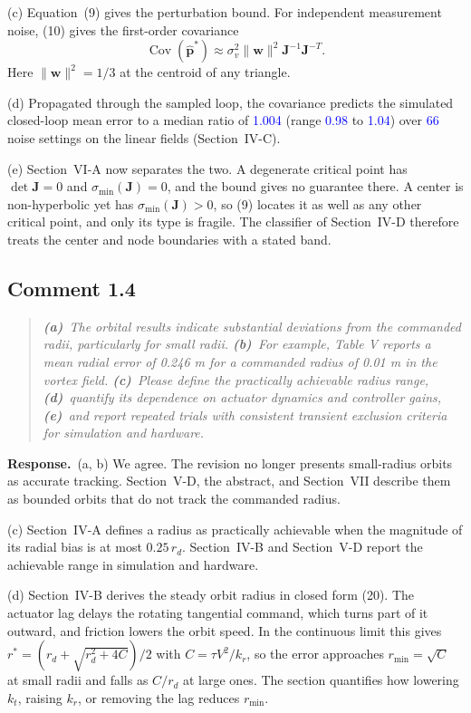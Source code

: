 \documentclass[10pt]{article}
\newcommand{\rev}[1]{\textcolor{blue}{#1}}           %
\newcommand{\resp}{\par\textbf{Response.}~}
\begin{document}
(c) Equation~(9) gives the perturbation bound. For independent measurement noise, (10) gives the first-order covariance
\[
\operatorname{Cov}(\hat{\mathbf{p}}^*) \approx \sigma_v^2\|\mathbf{w}\|^2\mathbf{J}^{-1}\mathbf{J}^{-T}.
\] Here $\|\mathbf{w}\|^2 = 1/3$ at the centroid of any triangle.

(d) Propagated through the sampled loop, the covariance predicts the simulated closed-loop mean error to a median ratio of \rev{1.004} (range \rev{0.98} to \rev{1.04}) over \rev{66} noise settings on the linear fields (Section~IV-C).

(e) Section~VI-A now separates the two. A degenerate critical point has $\det\mathbf{J} = 0$ and $\sigma_{\min}(\mathbf{J}) = 0$, and the bound gives no guarantee there. A center is non-hyperbolic yet has $\sigma_{\min}(\mathbf{J}) > 0$, so (9) locates it as well as any other critical point, and only its type is fragile. The classifier of Section~IV-D therefore treats the center and node boundaries with a stated band.

\subsection*{Comment 1.4}

\begin{quote}\itshape
\textbf{(a)}~The orbital results indicate substantial deviations from the commanded radii, particularly for small radii.
\textbf{(b)}~For example, Table V reports a mean radial error of 0.246 m for a commanded radius of 0.01 m in the vortex field.
\textbf{(c)}~Please define the practically achievable radius range,
\textbf{(d)}~quantify its dependence on actuator dynamics and controller gains,
\textbf{(e)}~and report repeated trials with consistent transient exclusion criteria for simulation and hardware.
\end{quote}


\resp (a, b) We agree. The revision no longer presents small-radius orbits as accurate tracking. Section~V-D, the abstract, and Section~VII describe them as bounded orbits that do not track the commanded radius.

(c) Section~IV-A defines a radius as practically achievable when the magnitude of its radial bias is at most $0.25\,r_d$. Section~IV-B and Section~V-D report the achievable range in simulation and hardware.

(d) Section~IV-B derives the steady orbit radius in closed form (20). The actuator lag delays the rotating tangential command, which turns part of it outward, and friction lowers the orbit speed. In the continuous limit this gives $r^* = (r_d + \sqrt{r_d^2 + 4C})/2$ with $C = \tau V^2/k_r$, so the error approaches $r_{\min} = \sqrt{C}$ at small radii and falls as $C/r_d$ at large ones. The section quantifies how lowering $k_t$, raising $k_r$, or removing the lag reduces $r_{\min}$.
\end{document}
